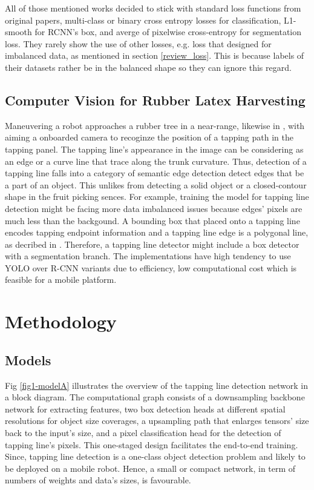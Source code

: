 \documentclass[default,pdflatex,iicol]{sn-jnl}%
\begin{document}
All of those mentioned works decided to stick with standard loss functions from original papers, multi-class or binary cross entropy losses for classification, L1-smooth for RCNN's box, and averge of pixelwise cross-entropy for segmentation loss. They rarely show the use of other losses, e.g. loss that designed for imbalanced data, as mentioned in section \ref{review_loss}. This is because labels of their datasets rather be in the balanced shape so they can ignore this regard.

\subsection{Computer Vision for Rubber Latex Harvesting}
Maneuvering a robot approaches a rubber tree in a near-range, likewise in \cite{zhang2019rubber, WANG2022103906}, with aiming a onboarded camera to recoginze the position of a tapping path in the tapping panel. The tapping line's appearance in the image can be considering as an edge or a curve line that trace along the trunk curvature. Thus, detection of a tapping line falls into a category of semantic edge detection \textemdash detect edges that be a part of an object. This unlikes from detecting a solid object or a closed-contour shape in the fruit picking sences. For example, training the model for tapping line detection might be facing more data imbalanced issues because edges' pixels are much less than the backgound. A bounding box that placed onto a tapping line encodes tapping endpoint information and a tapping line edge is a polygonal line, as decribed in \cite{Wongtanawijit_2021}. Therefore, a tapping line detector might include a box detector with a segmentation branch. The implementations have high tendency to use YOLO over R-CNN variants due to efficiency, low computational cost which is feasible for a mobile platform.


\section{Methodology}\label{sec-methodology}


\subsection{Models}\label{subsec-model}
Fig \ref{fig1-modelA} illustrates the overview of the tapping line detection network in a block diagram. The computational graph consists of a downsampling backbone network for extracting features, two box detection heads at different spatial resolutions for object size coverages, a upsampling path that enlarges tensors' size back to the input's size, and a pixel classification head for the detection of tapping line's pixels. This one-staged design facilitates the end-to-end training. Since, tapping line detection is a one-class object detection problem and likely to be deployed on a mobile robot. Hence, a small or compact network, in term of numbers of weights and data's sizes, is favourable.
\end{document}

